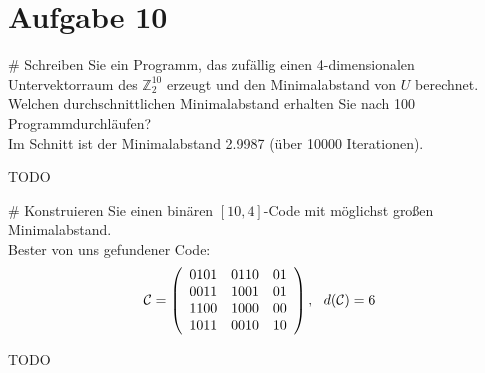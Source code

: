 \section*{Aufgabe 10}
\begin{myList}
#
Schreiben Sie ein Programm, das zufällig einen 4-dimensionalen Untervektorraum des $\mathbb{Z}^10_2$ erzeugt und den Minimalabstand von $U$ berechnet.
Welchen durchschnittlichen Minimalabstand erhalten Sie nach 100 Programmdurchläufen?\\
Im Schnitt ist der Minimalabstand 2.9987 (über 10000 Iterationen).

TODO

#
Konstruieren Sie einen binären $[10,4]$-Code mit möglichst großen Minimalabstand.\\
Bester von uns gefundener Code:\\
\begin{align*}
\mathcal{C} = \left( \begin{array}{ccc}
0101&0110&01\\
0011&1001&01\\
1100&1000&00\\
1011&0010&10
\end{array} \right),~~d(\mathcal{C})=6
\end{align*}

TODO
\end{myList}





